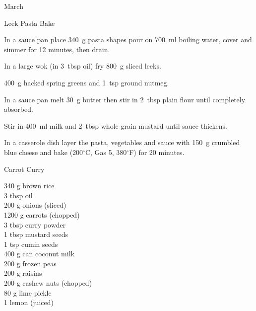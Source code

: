 \begin{menu}{March}
\begin{recipe}{2}{Leek Pasta Bake}
    \begin{instructions}
    \item 
    In a
    sauce pan
    place
    340~g  pasta shapes
    pour on
    700~ml  boiling water,
    cover and simmer for 12 minutes, then drain.
  \item 
        In a large wok
        (in 3~tbsp  oil)
        fry
        800~g sliced leeks.
      \item 400~g hacked spring greens
        and
        1~tsp  ground nutmeg.
      \item 
        In a sauce pan melt
        30~g  butter
        then stir in
        2~tbsp  plain flour
        until completely absorbed.
      \item 
        Stir in
        400~ml  milk
        and
        2~tbsp  whole grain mustard
        until sauce thickens.
      \item 
        In a casserole dish
        layer the pasta, vegetables and sauce with
        150~g crumbled blue cheese
        and bake
        (200$^{\circ}$C, Gas 5, 380$^{\circ}$F)
        for 20 minutes.
      
    \end{instructions}
    \end{recipe}%
  
    \begin{recipe}{2}{Carrot Curry}%
		\begin{ingredients}
		340 g brown rice  \\
	3 tbsp oil  \\
	200 g onions (sliced) \\
	1200 g carrots (chopped) \\
	3 tbsp curry powder  \\
	1 tbsp mustard seeds  \\
	1 tsp cumin seeds  \\
	400 g can coconut milk  \\
	200 g frozen peas  \\
	200 g raisins  \\
	200 g cashew nuts (chopped) \\
	80 g lime pickle  \\
	1  lemon (juiced) \\
	
		\end{ingredients}
	
	
	

\end{recipe}
\end{menu}
